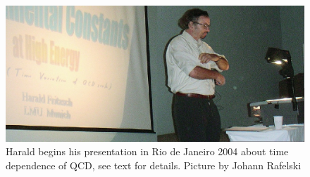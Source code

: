 \documentclass[addchapnum]{ws-rv961x669} %
\begin{document}
\begin{figure}%
\centerline{\includegraphics[width=0.95\columnwidth]{04RANPHarald1Ed.jpg}}
\caption{Harald begins his presentation in Rio de Janeiro 2004 about time dependence of QCD, see text for details. Picture by Johann Rafelski
}
\label{Fig:RANP2004} 
\end{figure}
 




\end{document}
